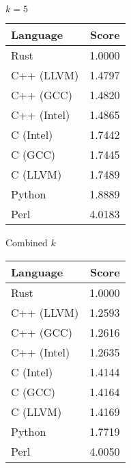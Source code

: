 \begin{subtable}{0.33\textwidth}
    \centering
    \caption{$k=5$}
    \label{table:runtime:regexp(5)}
    \begin{tabular}{|l|r|}
        \hline
        Language & Score \\
        \hline
        Rust & 1.0000 \\
        C++ (LLVM) & 1.4797 \\
        C++ (GCC) & 1.4820 \\
        C++ (Intel) & 1.4865 \\
        C (Intel) & 1.7442 \\
        C (GCC) & 1.7445 \\
        C (LLVM) & 1.7489 \\
        Python & 1.8889 \\
        Perl & 4.0183 \\
        \hline
    \end{tabular}
\end{subtable}%
\begin{subtable}{0.33\textwidth}
    \centering
    \caption{Combined $k$}
    \label{table:runtime:regexp:combined}
    \begin{tabular}{|l|r|}
        \hline
        Language & Score \\
        \hline
        Rust & 1.0000 \\
        C++ (LLVM) & 1.2593 \\
        C++ (GCC) & 1.2616 \\
        C++ (Intel) & 1.2635 \\
        C (Intel) & 1.4144 \\
        C (GCC) & 1.4164 \\
        C (LLVM) & 1.4169 \\
        Python & 1.7719 \\
        Perl & 4.0050 \\
        \hline
    \end{tabular}
\end{subtable}